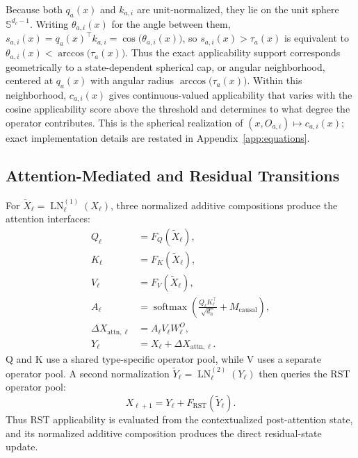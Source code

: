 \documentclass{article}
\begin{document}
Because both \(q_a(x)\) and \(k_{a,i}\) are unit-normalized, they lie on the
unit sphere \(\mathbb{S}^{d_c-1}\). Writing \(\theta_{a,i}(x)\) for the angle
between them, \(s_{a,i}(x)=q_a(x)^\top k_{a,i}=\cos\!\big(\theta_{a,i}(x)\big)\),
so \(s_{a,i}(x)>\tau_a(x)\) is equivalent to
\(\theta_{a,i}(x)<\arccos\!\big(\tau_a(x)\big)\). Thus the exact applicability
support corresponds geometrically to a state-dependent spherical cap, or
angular neighborhood, centered at \(q_a(x)\) with angular radius
\(\arccos\!\big(\tau_a(x)\big)\). Within this neighborhood,
\(c_{a,i}(x)\) gives continuous-valued applicability that varies with the cosine
applicability score above the threshold and determines to what degree the
operator contributes. This is the spherical realization of
\((x,O_{a,i})\mapsto c_{a,i}(x)\); exact implementation details are restated in
Appendix~\ref{app:equations}.

\subsection{Attention-Mediated and Residual Transitions}
\label{sec:block}

For \(\widetilde X_\ell=\operatorname{LN}^{(1)}_\ell(X_\ell)\), three
normalized additive compositions produce the attention interfaces:
\begin{align}
Q_\ell&=F_Q(\widetilde X_\ell),\nonumber\\
K_\ell&=F_K(\widetilde X_\ell),\nonumber\\
V_\ell&=F_V(\widetilde X_\ell),\nonumber\\
A_\ell&=\operatorname{softmax}\!\left(
\frac{Q_\ell K_\ell^\top}{\sqrt{d_h}}+M_{\mathrm{causal}}\right)
\!,\nonumber\\
\Delta X_{\mathrm{attn},\ell}&=A_\ell V_\ell W^O_\ell,\\
Y_\ell&=X_\ell+\Delta X_{\mathrm{attn},\ell}.
\label{eq:attention}
\end{align}
Q and K use a shared type-specific operator pool, while V uses a separate
operator pool. A second
normalization \(\widetilde Y_\ell=\operatorname{LN}^{(2)}_\ell(Y_\ell)\) then
queries the RST operator pool:
\begin{equation}
X_{\ell+1}=Y_\ell+F_{\mathrm{RST}}(\widetilde Y_\ell).
\label{eq:rst}
\end{equation}
Thus RST applicability is evaluated from the contextualized post-attention
state, and its normalized additive composition produces the direct
residual-state update.
\end{document}
